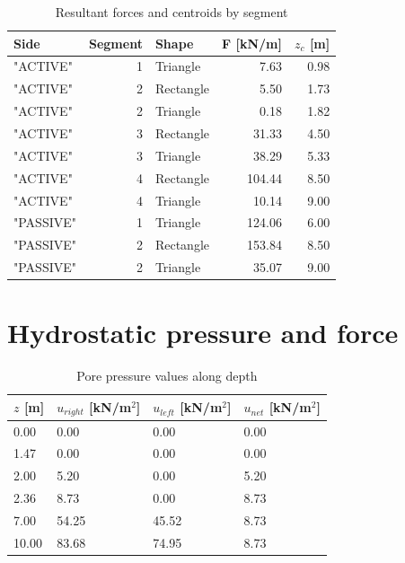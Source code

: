 \begin{table}[H]
  \centering
  \caption{Resultant forces and centroids by segment}
  \label{tab:appendix_forces_centroids}
  \small
  \setlength{\tabcolsep}{8pt}
  \renewcommand{\arraystretch}{1.15}
  \begin{tabular}{@{}l r l r r@{}}
    \toprule
    Side & Segment & Shape &
    F [kN/m] & $z_c$ [m] \\
    \midrule
    "ACTIVE" & 1 & Triangle  &  7.63 & 0.98 \\
    "ACTIVE" & 2 & Rectangle &  5.50 & 1.73 \\
    "ACTIVE" & 2 & Triangle  &  0.18 & 1.82 \\
    "ACTIVE" & 3 & Rectangle & 31.33 & 4.50 \\
    "ACTIVE" & 3 & Triangle  & 38.29 & 5.33 \\
    "ACTIVE" & 4 & Rectangle & 104.44 & 8.50 \\
    "ACTIVE" & 4 & Triangle  & 10.14 & 9.00 \\
    "PASSIVE" & 1 & Triangle  & 124.06 & 6.00 \\
    "PASSIVE" & 2 & Rectangle & 153.84 & 8.50 \\
    "PASSIVE" & 2 & Triangle  &  35.07 & 9.00 \\
    \bottomrule
  \end{tabular}
\end{table}

\section{Hydrostatic pressure and force}

\begin{table}[H]
  \centering
  \caption{Pore pressure values along depth}
  \label{tab:appenidx_u_profile}
  \small
  \setlength{\tabcolsep}{8pt}
  \renewcommand{\arraystretch}{1.15}
  \begin{tabular}{@{}l l l l@{}}
    \toprule
    \textbf{$z$ [m]} &
    \textbf{$u_{right}$ [kN/m$^2$]} &
    \textbf{$u_{left}$ [kN/m$^2$]} &
    \textbf{$u_{net}$ [kN/m$^2$]} \\
    \midrule
     0.00  &  0.00  &  0.00  &  0.00 \\
     1.47  &  0.00  &  0.00  &  0.00 \\
     2.00  &  5.20  &  0.00  &  5.20 \\
     2.36  &  8.73  &  0.00  &  8.73 \\
     7.00  & 54.25  & 45.52  &  8.73 \\
    10.00  & 83.68  & 74.95  &  8.73 \\
    \bottomrule
  \end{tabular}
\end{table}

